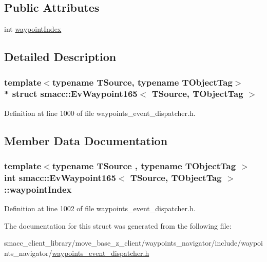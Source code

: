 \subsection*{Public Attributes}
\begin{DoxyCompactItemize}
\item 
int \hyperlink{structsmacc_1_1EvWaypoint165_a36e156e206bff6181d34f49d297dd388}{waypoint\+Index}
\end{DoxyCompactItemize}


\subsection{Detailed Description}
\subsubsection*{template$<$typename T\+Source, typename T\+Object\+Tag$>$\\*
struct smacc\+::\+Ev\+Waypoint165$<$ T\+Source, T\+Object\+Tag $>$}



Definition at line 1000 of file waypoints\+\_\+event\+\_\+dispatcher.\+h.



\subsection{Member Data Documentation}
\subsubsection[{\texorpdfstring{waypoint\+Index}{waypointIndex}}]{\setlength{\rightskip}{0pt plus 5cm}template$<$typename T\+Source , typename T\+Object\+Tag $>$ int {\bf smacc\+::\+Ev\+Waypoint165}$<$ T\+Source, T\+Object\+Tag $>$\+::waypoint\+Index}\hypertarget{structsmacc_1_1EvWaypoint165_a36e156e206bff6181d34f49d297dd388}{}\label{structsmacc_1_1EvWaypoint165_a36e156e206bff6181d34f49d297dd388}


Definition at line 1002 of file waypoints\+\_\+event\+\_\+dispatcher.\+h.



The documentation for this struct was generated from the following file\+:\begin{DoxyCompactItemize}
\item 
smacc\+\_\+client\+\_\+library/move\+\_\+base\+\_\+z\+\_\+client/waypoints\+\_\+navigator/include/waypoints\+\_\+navigator/\hyperlink{waypoints__event__dispatcher_8h}{waypoints\+\_\+event\+\_\+dispatcher.\+h}\end{DoxyCompactItemize}
